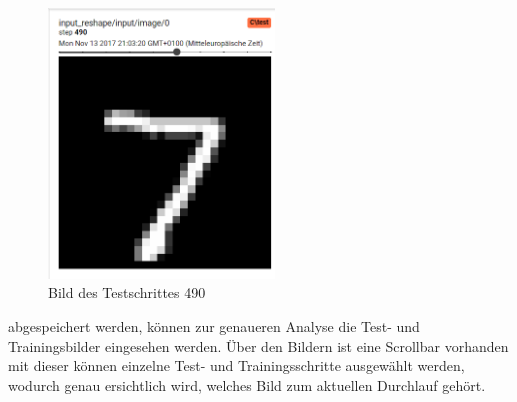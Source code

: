 \begin{figure}[htb!]
	\centering
     \includegraphics[width=6cm]{images/Kapitel_3/images.png}
	\vspace{10pt} 
	\caption{Bild des Testschrittes 490}
	\label{fig:DBvsTF}
\end{figure}

abgespeichert werden, können zur genaueren Analyse die Test- und Trainingsbilder eingesehen werden. 
Über den Bildern ist eine Scrollbar vorhanden mit dieser können einzelne Test- und Trainingsschritte ausgewählt werden, wodurch genau ersichtlich wird, welches Bild zum aktuellen Durchlauf gehört. \cite{tensorboard.2017}
\vspace{50pt}
\newpage


